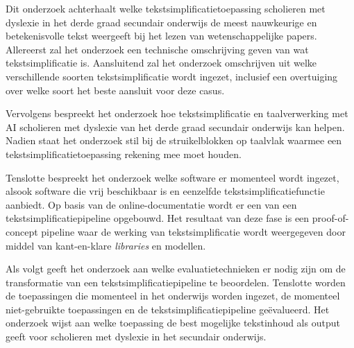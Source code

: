 
Dit onderzoek achterhaalt welke tekstsimplificatietoepassing scholieren met dyslexie in het derde graad secundair onderwijs de meest nauwkeurige en betekenisvolle tekst weergeeft bij het lezen van wetenschappelijke papers. Allereerst zal het onderzoek een technische omschrijving geven van wat tekstsimplificatie is. Aansluitend zal het onderzoek omschrijven uit welke verschillende soorten tekstsimplificatie wordt ingezet, inclusief een overtuiging over welke soort het beste aansluit voor deze casus. 

Vervolgens bespreekt het onderzoek hoe tekstsimplificatie en taalverwerking met AI scholieren met dyslexie van het derde graad secundair onderwijs kan helpen. Nadien staat het onderzoek stil bij de struikelblokken op taalvlak waarmee een tekstsimplificatietoepassing rekening mee moet houden. 

Tenslotte bespreekt het onderzoek welke software er momenteel wordt ingezet, alsook software die vrij beschikbaar is en eenzelfde tekstsimplificatiefunctie aanbiedt. Op basis van de online-documentatie wordt er een van een tekstsimplificatiepipeline opgebouwd. Het resultaat van deze fase is een proof-of-concept pipeline waar de werking van tekstsimplificatie wordt weergegeven door middel van kant-en-klare \textit{libraries} en modellen.

Als volgt geeft het onderzoek aan welke evaluatietechnieken er nodig zijn om de transformatie van een tekstsimplificatiepipeline te beoordelen. Tenslotte worden de toepassingen die momenteel in het onderwijs worden ingezet, de momenteel niet-gebruikte toepassingen en de tekstsimplificatiepipeline geëvalueerd. Het onderzoek wijst aan welke toepassing de best mogelijke tekstinhoud als output geeft voor scholieren met dyslexie in het secundair onderwijs.



